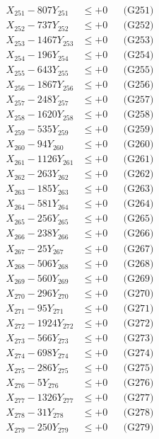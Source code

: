 \documentclass[a4paper,10pt]{article}
\begin{document}
{\begin{align}
\allowbreak
X_{251} - 807Y_{251} &\leq +0 && \text{(G251)} \\
X_{252} - 737Y_{252} &\leq +0 && \text{(G252)} \\
X_{253} - 1467Y_{253} &\leq +0 && \text{(G253)} \\
X_{254} - 196Y_{254} &\leq +0 && \text{(G254)} \\
X_{255} - 643Y_{255} &\leq +0 && \text{(G255)} \\
X_{256} - 1867Y_{256} &\leq +0 && \text{(G256)} \\
X_{257} - 248Y_{257} &\leq +0 && \text{(G257)} \\
X_{258} - 1620Y_{258} &\leq +0 && \text{(G258)} \\
X_{259} - 535Y_{259} &\leq +0 && \text{(G259)} \\
X_{260} - 94Y_{260} &\leq +0 && \text{(G260)} \\
\allowbreak
X_{261} - 1126Y_{261} &\leq +0 && \text{(G261)} \\
X_{262} - 263Y_{262} &\leq +0 && \text{(G262)} \\
X_{263} - 185Y_{263} &\leq +0 && \text{(G263)} \\
X_{264} - 581Y_{264} &\leq +0 && \text{(G264)} \\
X_{265} - 256Y_{265} &\leq +0 && \text{(G265)} \\
X_{266} - 238Y_{266} &\leq +0 && \text{(G266)} \\
X_{267} - 25Y_{267} &\leq +0 && \text{(G267)} \\
X_{268} - 506Y_{268} &\leq +0 && \text{(G268)} \\
X_{269} - 560Y_{269} &\leq +0 && \text{(G269)} \\
X_{270} - 296Y_{270} &\leq +0 && \text{(G270)} \\
\allowbreak
X_{271} - 95Y_{271} &\leq +0 && \text{(G271)} \\
X_{272} - 1924Y_{272} &\leq +0 && \text{(G272)} \\
X_{273} - 566Y_{273} &\leq +0 && \text{(G273)} \\
X_{274} - 698Y_{274} &\leq +0 && \text{(G274)} \\
X_{275} - 286Y_{275} &\leq +0 && \text{(G275)} \\
X_{276} - 5Y_{276} &\leq +0 && \text{(G276)} \\
X_{277} - 1326Y_{277} &\leq +0 && \text{(G277)} \\
X_{278} - 31Y_{278} &\leq +0 && \text{(G278)} \\
X_{279} - 250Y_{279} &\leq +0 && \text{(G279)} \\

\end{align}}
\end{document}
